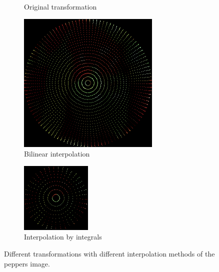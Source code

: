 \begin{figure}
\begin{subfigure}{.49\textwidth}
    \caption{Original transformation}
    \end{subfigure}
    \begin{subfigure}{.49\textwidth}
        \centering
    \includegraphics[width=\textwidth]{figures/pepper_bilinear.png}
    \caption{Bilinear interpolation}
    \end{subfigure}
    \begin{subfigure}{.49\textwidth}
        \centering
    \includegraphics[width=\textwidth]{figures/pepper_integral.png}
    \caption{Interpolation by integrals}
    \end{subfigure}
    \caption{Different transformations with different interpolation methods of the peppers image.}
    \label{fig:pepper_trans}
\end{figure}